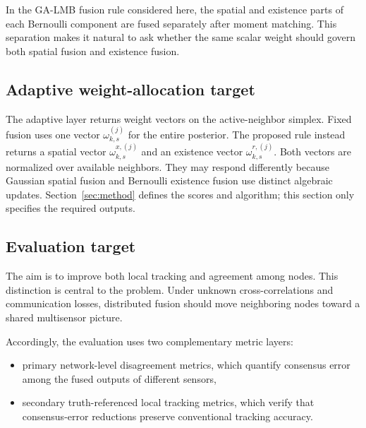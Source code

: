 In the GA-LMB fusion rule considered here, the spatial and existence parts of each Bernoulli component are fused separately after moment matching. This separation makes it natural to ask whether the same scalar weight should govern both spatial fusion and existence fusion.

\subsection{Adaptive weight-allocation target}

The adaptive layer returns weight vectors on the active-neighbor simplex. Fixed fusion uses one vector $\omega_{k,s}^{(j)}$ for the entire posterior. The proposed rule instead returns a spatial vector $\omega_{k,s}^{x,(j)}$ and an existence vector $\omega_{k,s}^{r,(j)}$. Both vectors are normalized over available neighbors. They may respond differently because Gaussian spatial fusion and Bernoulli existence fusion use distinct algebraic updates. Section~\ref{sec:method} defines the scores and algorithm; this section only specifies the required outputs.

\subsection{Evaluation target}

The aim is to improve both local tracking and agreement among nodes. This distinction is central to the problem. Under unknown cross-correlations and communication losses, distributed fusion should move neighboring nodes toward a shared multisensor picture.

Accordingly, the evaluation uses two complementary metric layers:
\begin{itemize}
\item primary network-level disagreement metrics, which quantify consensus error among the fused outputs of different sensors,
\item secondary truth-referenced local tracking metrics, which verify that consensus-error reductions preserve conventional tracking accuracy.
\end{itemize}

